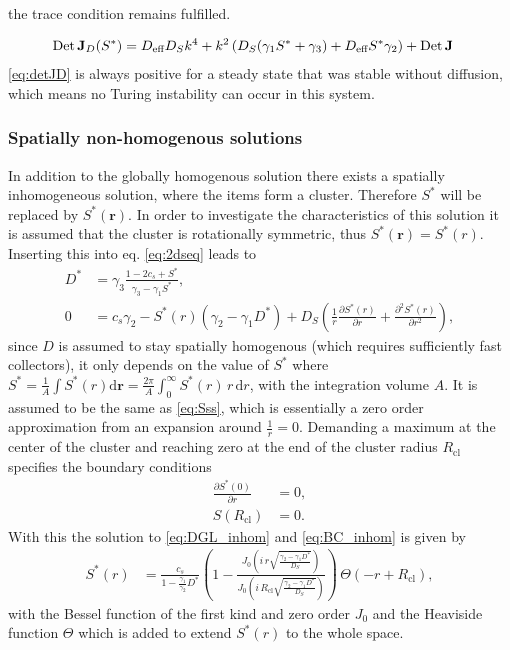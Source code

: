 the trace condition remains fulfilled. 

\begin{align}
 \label{eq:detJD}\operatorname{Det} \mathbf{J}_D(S^*) &= D_{\text{eff}}D_S k^4+k^2\left(D_S(\gamma_1 S^*+\gamma_3)+D_{\text{eff}}S^*\gamma_2\right)+\operatorname{Det} \mathbf{J}
\end{align}
%
\eqref{eq:detJD} is always positive for a steady state that was stable without diffusion, which means no Turing instability can occur in this system.

\subsubsection{Spatially non-homogenous solutions}

In addition to the globally homogenous solution there exists a spatially inhomogeneous solution, where the items form a cluster. 
Therefore $S^*$ will be replaced by $S^*(\mathbf r)$. In order to investigate the characteristics of this solution it is assumed that the cluster is rotationally
 symmetric, thus $S^*(\mathbf r)=S^*(r)$. Inserting this into eq. \eqref{eq:2dseq} leads to
%
\begin{align}
 \nonumber D^* &= \gamma_3\frac{1-2c_s+S^*}{\gamma_3-\gamma_1 S^*},\\
 0 &= c_s\gamma_2-S^*(r)\left(\gamma_2-\gamma_1 D^*\right)+D_S\left(\frac{1}{r}\frac{\partial S^*(r)}{\partial r}+\frac{\partial^2 S^*(r)}{\partial r^2}\right),
 \label{eq:DGL_inhom}
\end{align}
since $D$ is assumed to stay spatially homogenous (which requires sufficiently fast collectors), it only depends on the value of $S^*$ where $S^*=\frac{1}{A}\int S^*(r) \mathrm d\mathbf r=\frac{2\pi}{A}\int_0^\infty S^*(r)\,r\,\mathrm dr$, with the integration volume $A$. It is assumed to be the same as \eqref{eq:Sss}, which is essentially a zero order approximation from an expansion around $\frac{1}{r}=0$.
Demanding a maximum at the center of the cluster and reaching zero at the end of the cluster radius $R_\text{cl}$ specifies the boundary conditions 
%
\begin{align}
 \nonumber \frac{\partial S^*(0)}{\partial r} &= 0, \\
 S(R_\text{cl}) &= 0.
\label{eq:BC_inhom}
\end{align}
%
With this the solution to \eqref{eq:DGL_inhom} and \eqref{eq:BC_inhom} is given by
%
\begin{align}
 S^*(r) &= \frac{c_s}{1-\frac{\gamma_1}{\gamma_2}D^*}\left(1-\frac{J_0\left(i\,r\sqrt{\frac{\gamma_2-\gamma_1D^*}{D_S}}\right)}{J_0\left(i\,R_\text{cl}\sqrt{\frac{\gamma_2-\gamma_1D^*}{D_S}}\right)}\right)\,\Theta(-r+R_\text{cl}),
\end{align}
%
with the Bessel function of the first kind and zero order $J_0$ and the Heaviside function $\Theta$ which is added to extend $S^*(r)$ to the whole space.

